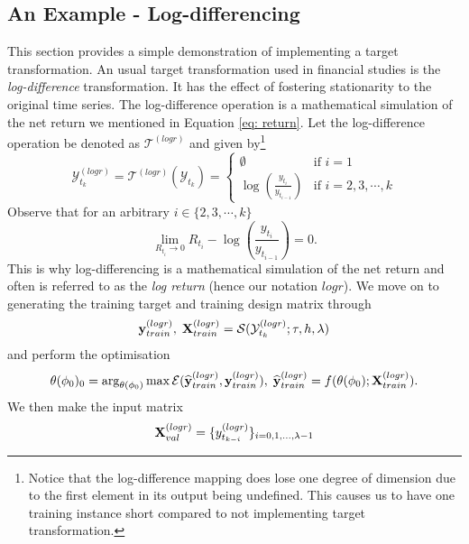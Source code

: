 \subsection{An Example - Log-differencing}\label{subsec: log-diff transformation}
This section provides a simple demonstration of implementing a target transformation. An usual target transformation used in financial studies is the \textit{log-difference} transformation. It has the effect of fostering stationarity to the original time series. The log-difference operation is a mathematical simulation of the net return we mentioned in Equation \ref{eq: return}. Let the log-difference operation be denoted as $\mathcal{T}^{(logr)}$ and given by\footnote{Notice that the log-difference mapping does lose one degree of dimension due to the first element in its output being undefined. This causes us to have one training instance short compared to not implementing target transformation.}
\begin{equation*}
    \mathcal{Y}^{(logr)}_{t_k} = \mathcal{T}^{(logr)}(\mathcal{Y}_{t_k}) = \begin{cases}
        \emptyset                  &\text{if $i = 1$} \\
        \log(\frac{y_{t_i}}{y_{t_{i-1}}})  &\text{if $i = 2, 3, \cdots, k$}
    \end{cases}
\end{equation*}
Observe that for an arbitrary $i \in \{2, 3, \cdots, k \}$
\begin{equation*}
    \lim_{R_{t_i} \rightarrow 0}{R_{t_i} - \log(\frac{y_{t_i}}{y_{t_{i-1}}}) = 0}.
\end{equation*}
This is why log-differencing is a mathematical simulation of the net return and often is referred to as the \textit{log return} (hence our notation $logr$). We move on to generating the training target and training design matrix through
\begin{equation*}
    \mathbf{y}^{(logr)}_{train}, \; \mathbf{X}^{(logr)}_{train} = \mathcal{S}(\mathcal{Y}^{(logr)}_{t_k}; \tau, h, \lambda)
\end{equation*}
and perform the optimisation
\begin{equation*}
    \theta(\phi_0)_0 = \arg_{\theta(\phi_0)} \max \mathcal{E}(\widehat{\mathbf{y}}^{(logr)}_{train}, \mathbf{y}^{(logr)}_{train}), \; \widehat{\mathbf{y}}^{(logr)}_{train} = f(\theta(\phi_0); \mathbf{X}^{(logr)}_{train}).
\end{equation*}
We then make the input matrix
\begin{equation*}
    \mathbf{X}^{(logr)}_{val} = \{y^{(logr)}_{t_{k-i}} \}_{i = 0, 1, \ldots, \lambda-1}
\end{equation*}
